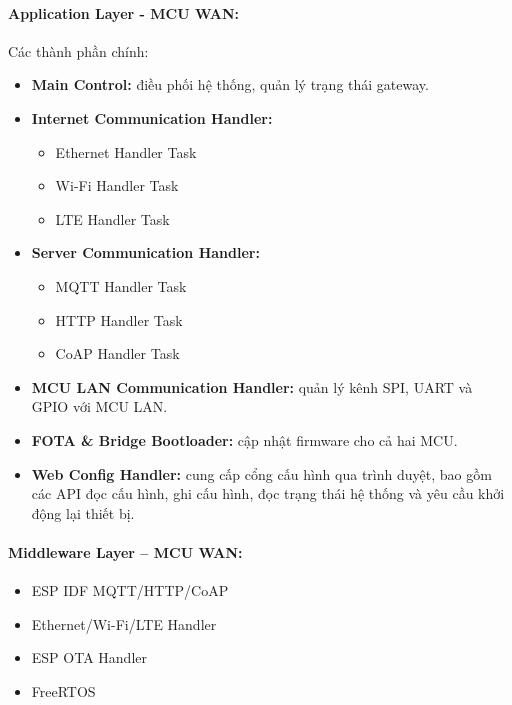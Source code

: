             \paragraph{Application Layer - MCU WAN:}
            Các thành phần chính:
                \begin{itemize}
                    \item \textbf{Main Control:} điều phối hệ thống, quản lý trạng thái gateway.
                    
                    \item \textbf{Internet Communication Handler:}
                    \begin{itemize}
                        \item Ethernet Handler Task
                        \item Wi-Fi Handler Task
                        \item LTE Handler Task
                    \end{itemize}
                
                    \item \textbf{Server Communication Handler:}
                    \begin{itemize}
                        \item MQTT Handler Task
                        \item HTTP Handler Task
                        \item CoAP Handler Task
                    \end{itemize}
                
                    \item \textbf{MCU LAN Communication Handler:} quản lý kênh SPI, UART và GPIO với MCU LAN.
                    
                    \item \textbf{FOTA \& Bridge Bootloader:} cập nhật firmware cho cả hai MCU.
                    
                    \item \textbf{Web Config Handler:} cung cấp cổng cấu hình qua trình duyệt, bao gồm các API đọc cấu hình, ghi cấu hình, đọc trạng thái hệ thống và yêu cầu khởi động lại thiết bị.
                \end{itemize}

            \paragraph{Middleware Layer – MCU WAN:}
                \begin{itemize}
                    \item ESP IDF MQTT/HTTP/CoAP
                    \item Ethernet/Wi-Fi/LTE Handler
                    \item ESP OTA Handler
                    \item FreeRTOS
                \end{itemize}

